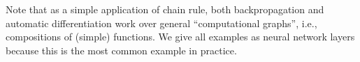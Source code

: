\documentclass[../../book-main.tex]{subfiles}
\begin{document}
Note that as a simple application of chain rule, both backpropagation and automatic differentiation work over general ``computational graphs'', i.e., compositions of (simple) functions. We give all examples as neural network layers because this is the most common example in practice.



\end{document}
